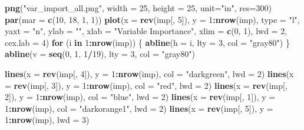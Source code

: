 \documentclass[]{book}
\newenvironment{Shaded}{\begin{snugshade}}{\end{snugshade}}
\newcommand{\KeywordTok}[1]{\textcolor[rgb]{0.13,0.29,0.53}{\textbf{{#1}}}}
\newcommand{\DataTypeTok}[1]{\textcolor[rgb]{0.13,0.29,0.53}{{#1}}}
\newcommand{\DecValTok}[1]{\textcolor[rgb]{0.00,0.00,0.81}{{#1}}}
\newcommand{\StringTok}[1]{\textcolor[rgb]{0.31,0.60,0.02}{{#1}}}
\newcommand{\ControlFlowTok}[1]{\textcolor[rgb]{0.13,0.29,0.53}{\textbf{{#1}}}}
\newcommand{\OperatorTok}[1]{\textcolor[rgb]{0.81,0.36,0.00}{\textbf{{#1}}}}
\newcommand{\NormalTok}[1]{{#1}}
\theoremstyle{definition}
\theoremstyle{definition}
\theoremstyle{remark}
\begin{document}
\begin{Shaded}
\begin{Highlighting}[]
\KeywordTok{png}\NormalTok{(}\StringTok{"var_import_all.png"}\NormalTok{, }\DataTypeTok{width =} \DecValTok{25}\NormalTok{, }\DataTypeTok{height =} \DecValTok{25}\NormalTok{, }\DataTypeTok{unit=}\StringTok{"in"}\NormalTok{, }\DataTypeTok{res=}\DecValTok{300}\NormalTok{)}
\KeywordTok{par}\NormalTok{(}\DataTypeTok{mar =} \KeywordTok{c}\NormalTok{(}\DecValTok{10}\NormalTok{, }\DecValTok{18}\NormalTok{, }\DecValTok{1}\NormalTok{, }\DecValTok{1}\NormalTok{))}
\KeywordTok{plot}\NormalTok{(}\DataTypeTok{x =} \KeywordTok{rev}\NormalTok{(imp[, }\DecValTok{5}\NormalTok{]), }\DataTypeTok{y =} \DecValTok{1}\OperatorTok{:}\KeywordTok{nrow}\NormalTok{(imp), }\DataTypeTok{type =} \StringTok{"l"}\NormalTok{, }\DataTypeTok{yaxt =} \StringTok{"n"}\NormalTok{, }
     \DataTypeTok{ylab =} \StringTok{""}\NormalTok{, }\DataTypeTok{xlab =} \StringTok{"Variable Importance"}\NormalTok{,}
     \DataTypeTok{xlim =} \KeywordTok{c}\NormalTok{(}\DecValTok{0}\NormalTok{, }\DecValTok{1}\NormalTok{), }\DataTypeTok{lwd =} \DecValTok{2}\NormalTok{, }\DataTypeTok{cex.lab =} \DecValTok{4}\NormalTok{)}
\ControlFlowTok{for}\NormalTok{ (i }\ControlFlowTok{in} \DecValTok{1}\OperatorTok{:}\KeywordTok{nrow}\NormalTok{(imp)) \{}
  \KeywordTok{abline}\NormalTok{(}\DataTypeTok{h =}\NormalTok{ i, }\DataTypeTok{lty =} \DecValTok{3}\NormalTok{, }\DataTypeTok{col =} \StringTok{"gray80"}\NormalTok{)}
\NormalTok{\}}
\KeywordTok{abline}\NormalTok{(}\DataTypeTok{v =} \KeywordTok{seq}\NormalTok{(}\DecValTok{0}\NormalTok{, }\DecValTok{1}\NormalTok{, }\DecValTok{1}\OperatorTok{/}\DecValTok{19}\NormalTok{), }\DataTypeTok{lty =} \DecValTok{3}\NormalTok{, }\DataTypeTok{col =} \StringTok{"gray80"}\NormalTok{)}

\KeywordTok{lines}\NormalTok{(}\DataTypeTok{x =} \KeywordTok{rev}\NormalTok{(imp[, }\DecValTok{4}\NormalTok{]), }\DataTypeTok{y =} \DecValTok{1}\OperatorTok{:}\KeywordTok{nrow}\NormalTok{(imp), }\DataTypeTok{col =} \StringTok{"darkgreen"}\NormalTok{, }\DataTypeTok{lwd =} \DecValTok{2}\NormalTok{)}
\KeywordTok{lines}\NormalTok{(}\DataTypeTok{x =} \KeywordTok{rev}\NormalTok{(imp[, }\DecValTok{3}\NormalTok{]), }\DataTypeTok{y =} \DecValTok{1}\OperatorTok{:}\KeywordTok{nrow}\NormalTok{(imp), }\DataTypeTok{col =} \StringTok{"red"}\NormalTok{, }\DataTypeTok{lwd =} \DecValTok{2}\NormalTok{)}
\KeywordTok{lines}\NormalTok{(}\DataTypeTok{x =} \KeywordTok{rev}\NormalTok{(imp[, }\DecValTok{2}\NormalTok{]), }\DataTypeTok{y =} \DecValTok{1}\OperatorTok{:}\KeywordTok{nrow}\NormalTok{(imp), }\DataTypeTok{col =} \StringTok{"blue"}\NormalTok{, }\DataTypeTok{lwd =} \DecValTok{2}\NormalTok{)}
\KeywordTok{lines}\NormalTok{(}\DataTypeTok{x =} \KeywordTok{rev}\NormalTok{(imp[, }\DecValTok{1}\NormalTok{]), }\DataTypeTok{y =} \DecValTok{1}\OperatorTok{:}\KeywordTok{nrow}\NormalTok{(imp), }\DataTypeTok{col =} \StringTok{"darkorange1"}\NormalTok{, }\DataTypeTok{lwd =} \DecValTok{2}\NormalTok{)}
\KeywordTok{lines}\NormalTok{(}\DataTypeTok{x =} \KeywordTok{rev}\NormalTok{(imp[, }\DecValTok{5}\NormalTok{]), }\DataTypeTok{y =} \DecValTok{1}\OperatorTok{:}\KeywordTok{nrow}\NormalTok{(imp), }\DataTypeTok{lwd =} \DecValTok{3}\NormalTok{)}


\end{Highlighting}
\end{Shaded}
\end{document}
